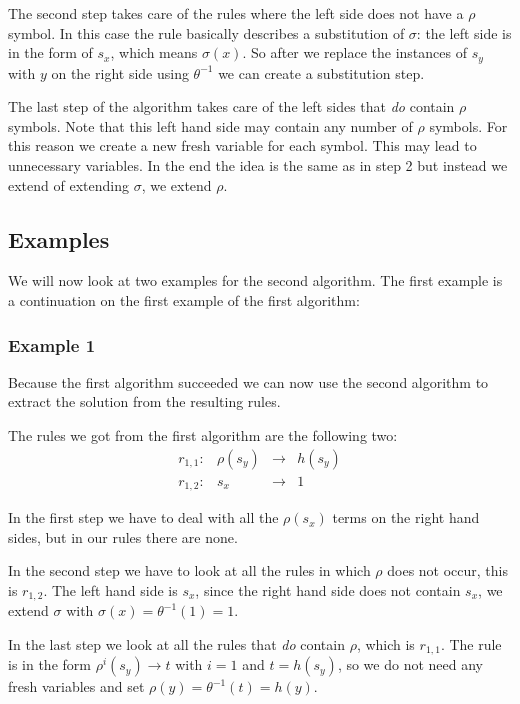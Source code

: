 The second step takes care of the rules where the left side does not have a $\rho$ symbol. In this case the rule basically describes a substitution of $\sigma$: the left side is in the form of $s_x$, which means $\sigma(x)$. So after we replace the instances of $s_y$ with $y$ on the right side using $\theta^{-1}$ we can create a substitution step.

The last step of the algorithm takes care of the left sides that \textit{do} contain $\rho$ symbols. Note that this left hand side may contain any number of $\rho$ symbols. For this reason we create a new fresh variable for each symbol. This may lead to unnecessary variables. In the end the idea is the same as in step 2 but instead we extend of extending $\sigma$, we extend $\rho$. 

\subsection{Examples} %
We will now look at two examples for the second algorithm. The first example is a continuation on the first example of the first algorithm:
\subsubsection*{Example 1}
Because the first algorithm succeeded we can now use the second algorithm to extract the solution from the resulting rules. 

The rules we got from the first algorithm are the following two:
$$
\begin{array}{lrcl}
    r_{1,1}: & \rho(s_y) & \rightarrow & h(s_y) \\
    r_{1,2}: & s_x & \rightarrow & 1
\end{array}
$$

In the first step we have to deal with all the $\rho(s_x)$ terms on the right hand sides, but in our rules there are none. 

In the second step we have to look at all the rules in which $\rho$ does not occur, this is $r_{1,2}$. The left hand side is $s_x$, since the right hand side does not contain $s_x$, we extend $\sigma$ with $\sigma(x) = \theta^{-1}(1) = 1$.

In the last step we look at all the rules that \textit{do} contain $\rho$, which is $r_{1,1}$. The rule is in the form $\rho^i(s_y) \rightarrow t$ with $i=1$ and $t = h(s_y)$, so we do not need any fresh variables and set $\rho(y) = \theta^{-1}(t) = h(y)$.

